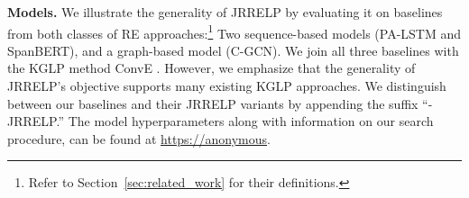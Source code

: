 \textbf{Models.}
We illustrate the generality of JRRELP by evaluating it on baselines from both classes of RE approaches:\footnote{Refer to Section~\ref{sec:related_work} for their definitions.}
Two sequence-based models (PA-LSTM and SpanBERT), and a graph-based model (C-GCN). 
We join all three baselines with the KGLP method ConvE \cite{dettmers2018conve}.
However, we emphasize that the generality of JRRELP's objective supports many existing KGLP approaches.
We distinguish between our baselines and their JRRELP variants by appending the suffix ``-JRRELP.''
The model hyperparameters along with information on our search procedure, can be found at \url{https://anonymous}.

